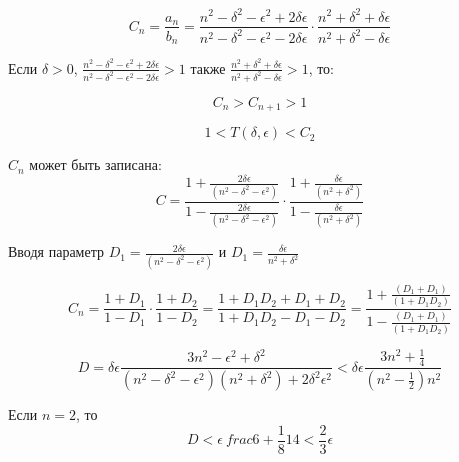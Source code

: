 \begin{equation}
	\label{eq:equation105}
	C_{n} = \frac{a_{n}}{b_{n}} = \frac{n^2 -\delta^2 - \epsilon^2 + 2\delta \epsilon}{n^2 -\delta^2 - \epsilon^2 - 2\delta \epsilon} \cdot \frac{n^2 + \delta^2 + \delta \epsilon}{n^2 + \delta^2 - \delta \epsilon}
\end{equation}

Если $\delta > 0$, $\frac{n^2 - \delta^2 - \epsilon^2 +2\delta \epsilon}{n^2 - \delta^2 - \epsilon^2 - 2\delta \epsilon} > 1$ также $\frac{n^2 + \delta^2 + \delta \epsilon}{n^2 + \delta^2 - \delta \epsilon} > 1$, то:

\begin{equation}
	\label{eq:equation106}
	C_{n} > C_{n + 1} > 1 
\end{equation}

\begin{equation}
	\label{eq:equation107}
	1 < T(\delta, \epsilon) < C_{2}
\end{equation} 

$C_{n}$ может быть записана:
\begin{equation}
	\label{eq:equation108}
	C = \frac{1 + \frac{2 \delta \epsilon}{(n^2 - \delta^2 - \epsilon^2)}}{1 - \frac{2 \delta \epsilon}{(n^2 - \delta^2 - \epsilon^2)}} \cdot \frac{1 + \frac{\delta \epsilon}{(n^2 + \delta^2)}}{1 - \frac{\delta \epsilon}{(n^2 + \delta^2)}}
\end{equation} 

Вводя параметр $D_{1} =  \frac{2 \delta \epsilon}{(n^2 - \delta^2 - \epsilon^2)}$ и $D_{1} =  \frac{\delta \epsilon}{n^2 + \delta^2}$

\begin{equation}
	\label{eq:equation109}
	C_{n} = \frac{1 + D_{1}}{1 - D_{1}} \cdot  \frac{1 + D_{2}}{1 - D_{2}} = \frac{1 + D_{1}D_{2} + D_{1} + D_{2}}{1 + D_{1}D_{2} - D_{1} - D_{2}} = \frac{1 + \frac{(D_{1} + D_{1})}{(1 + D_{1}D_{2})}}{1 - \frac{(D_{1} + D_{1})}{(1 + D_{1}D_{2})}}
\end{equation} 

\begin{equation}
	\label{eq:equation110}
	D = \delta \epsilon \frac{3n^2 - \epsilon^2 + \delta^2}{(n^2 - \delta^2 - \epsilon ^2)(n^2 + \delta ^2) + 2 \delta ^2 \epsilon^2} < \delta \epsilon \frac{3 n^2 + \frac{1}{4}}{(n^2 - \frac{1}{2})n^2}
\end{equation} 

Если $n = 2$, то
\begin{equation}
	\label{eq:equation111}
	D < \epsilon \ frac{6 + \frac{1}{8}}{14} < \frac{2}{3} \epsilon
\end{equation} 

